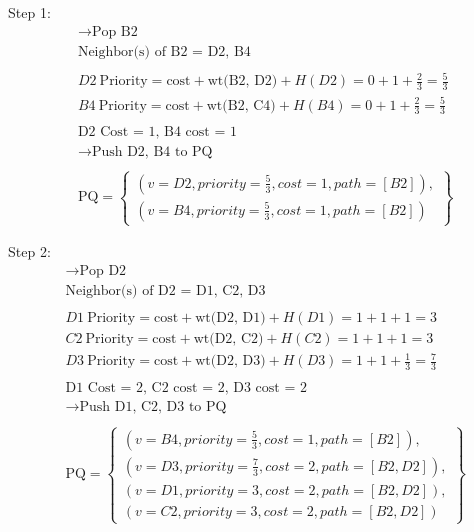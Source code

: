 \documentclass[a4paper]{article}
\begin{document}
\begin{sloppypar}
\begin{enumerate}[start=6,label=Q\arabic*,left=0pt]
    \par Step 1:
    \begin{align*}
        &\rightarrow \text{Pop B2} \\
        &\text{Neighbor(s) of B2 = D2, B4} \\\\
        &D2 \: \text{Priority} = \text{cost} + \text{wt(B2, D2)} + H(D2) = 0 + 1 + \frac{2}{3} = \frac{5}{3} \\
        &B4 \: \text{Priority} = \text{cost} + \text{wt(B2, C4)} + H(B4) = 0 + 1 + \frac{2}{3} = \frac{5}{3} \\\\
        &\text{D2 Cost = 1, B4 cost = 1} \\
        &\rightarrow \text{Push D2, B4 to PQ} \\\\
        &\text{PQ} = \left\{\begin{array}{l}
            (v=D2, priority=\frac{5}{3}, cost=1, path=[B2]), \\
            (v=B4, priority=\frac{5}{3}, cost=1, path=[B2])
        \end{array}\right\}
    \end{align*}

    \par Step 2:
    \begin{align*}
        &\rightarrow \text{Pop D2} \\
        &\text{Neighbor(s) of D2 = D1, C2, D3} \\\\
        &D1 \: \text{Priority} = \text{cost} + \text{wt(D2, D1)} + H(D1) = 1 + 1 + 1 = 3 \\
        &C2 \: \text{Priority} = \text{cost} + \text{wt(D2, C2)} + H(C2) = 1 + 1 + 1 = 3 \\
        &D3 \: \text{Priority} = \text{cost} + \text{wt(D2, D3)} + H(D3) = 1 + 1 + \frac{1}{3} = \frac{7}{3} \\\\
        &\text{D1 Cost = 2, C2 cost = 2, D3 cost = 2} \\
        &\rightarrow \text{Push D1, C2, D3 to PQ} \\\\
        &\text{PQ} = \left\{\begin{array}{l}
            (v=B4, priority=\frac{5}{3}, cost=1, path=[B2]), \\
            (v=D3, priority=\frac{7}{3}, cost=2, path=[B2, D2]), \\
            (v=D1, priority=3, cost=2, path=[B2, D2]), \\
            (v=C2, priority=3, cost=2, path=[B2, D2])
        \end{array}\right\}
    \end{align*}


\end{enumerate}
\end{sloppypar}
\end{document}
